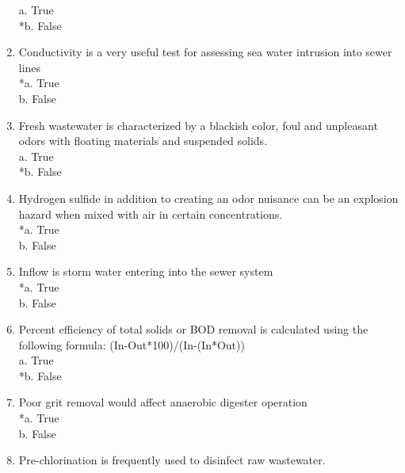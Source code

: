 \begin{enumerate}
a. True \\
*b. False 

\vspace{0.4cm}
\item  Conductivity is a very useful test for assessing sea water intrusion into sewer lines \\

*a. True \\
b. False 

\vspace{0.4cm}
\item  Fresh wastewater is characterized by a blackish color, foul and unpleasant odors with floating materials and suspended solids. \\

a. True \\
*b. False 

\vspace{0.4cm}
\item  Hydrogen sulfide in addition to creating an odor nuisance can be an explosion hazard when mixed with air in certain concentrations. \\

*a. True \\
b. False 

\vspace{0.4cm}
\item  Inflow is storm water entering into the sewer system \\

*a. True \\
b. False 

\vspace{0.4cm}
\item  Percent efficiency of total solids or BOD removal is calculated using the following formula: (In-Out*100)/(In-(In*Out)) \\

a. True \\
*b. False 

\vspace{0.4cm}
\item  Poor grit removal would affect anaerobic digester operation \\

*a. True \\
b. False 

\vspace{0.4cm}
\item  Pre-chlorination is frequently used to disinfect raw wastewater. \\


\end{enumerate}
